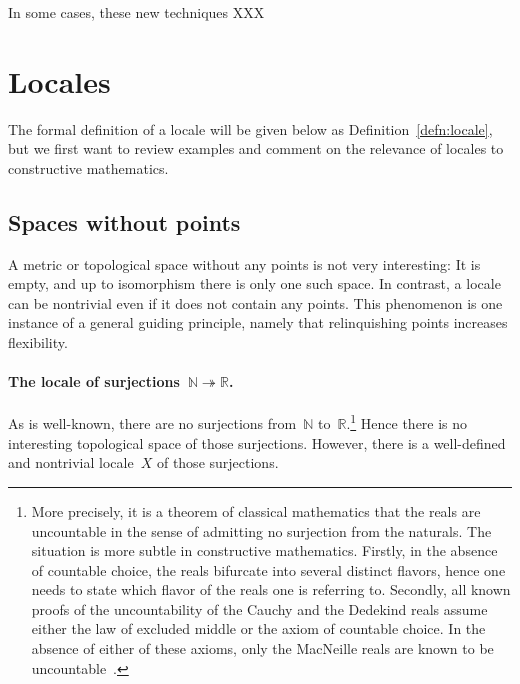 \documentclass{ws-rv9x6}
\newcommand{\NN}{\mathbb{N}}
\newcommand{\RR}{\mathbb{R}}
\renewcommand{\_}{\mathpunct{.}}
\newcommand{\?}{\,{:}\,}
\begin{document}
In some cases, these new techniques XXX


\section{Locales}
\label{sect:locales}

The formal definition of a locale will be given below as
Definition~\ref{defn:locale}, but we first want to review examples and comment on
the relevance of locales to constructive mathematics.

\subsection{Spaces without points}
\label{sect:examples-no-points}

A metric or topological space without any points is not very interesting: It is
empty, and up to isomorphism there is only one such space. In contrast, a
locale can be nontrivial even if it does not contain any points. This
phenomenon is one instance of a general guiding principle, namely that relinquishing
points increases flexibility.

\paragraph{The locale of surjections~$\NN \twoheadrightarrow \RR$.} As is
well-known, there are no surjections from~$\NN$ to~$\RR$.\footnote{More
precisely, it is a theorem of classical mathematics that the reals are
uncountable in the sense of admitting no surjection from the naturals. The
situation is more subtle in constructive mathematics. Firstly, in the absence
of countable choice, the reals bifurcate into several distinct flavors, hence
one needs to state which flavor of the reals one is referring to. Secondly, all
known proofs of the uncountability of the Cauchy and the Dedekind reals assume
either the law of excluded middle or the axiom of countable choice. In the
absence of either of these axioms, only the MacNeille reals are known to be
uncountable~\cite{blechschmidt-hutzler:macneille}.} Hence there is no
interesting topological space of those surjections. However, there is a
well-defined and nontrivial locale~$X$ of those surjections.
\end{document}

